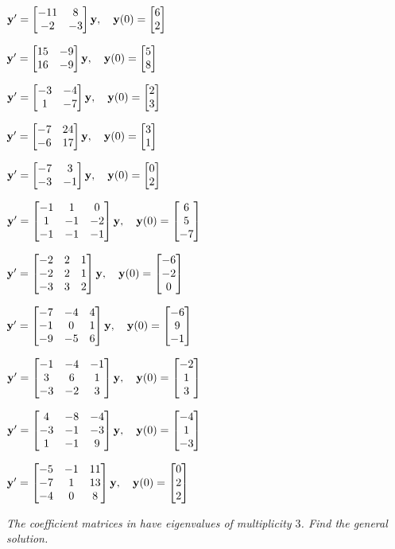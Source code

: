 \begin{exerciselist}
\item\label{exer:10.5.13}$\mathbf{y}'=\begin{bmatrix}-11&8\\-2&-3\end{bmatrix}\mathbf{y} ,\quad\mathbf{y}(0)=\begin{bmatrix}6\\2\end{bmatrix}$

\item\label{exer:10.5.14}$\mathbf{y}'=\begin{bmatrix}15&-9\\16&-9\end{bmatrix}\mathbf{y} ,\quad\mathbf{y}(0)=\begin{bmatrix}5\\8\end{bmatrix}$

\item\label{exer:10.5.15}$\mathbf{y}'=\begin{bmatrix}-3&-4\\1&-7\end{bmatrix}\mathbf{y},\quad\mathbf{y}(0)=\begin{bmatrix}2\\3\end{bmatrix}$

\item\label{exer:10.5.16}$\mathbf{y}'=\begin{bmatrix}-7&24\\-6&17\end{bmatrix}\mathbf{y} ,\quad\mathbf{y}(0)=\begin{bmatrix}3\\1\end{bmatrix}$

\item\label{exer:10.5.17}$\mathbf{y}'=\begin{bmatrix}-7&3\\-3&-1\end{bmatrix}\mathbf{y} ,\quad\mathbf{y}(0)=\begin{bmatrix}0\\2\end{bmatrix}$

\item\label{exer:10.5.18}$\mathbf{y}'
=\begin{bmatrix}-1&1&0\\1&-1&-2\\-1&-1&-1\end{bmatrix}\mathbf{y},\quad
\mathbf{y}(0)=\begin{bmatrix}6\\5\\-7\end{bmatrix}$

\item\label{exer:10.5.19}$\mathbf{y}'
=\begin{bmatrix}-2&2&1\\-2&2&1\\-3&3&2\end{bmatrix}\mathbf{y},\quad
\mathbf{y}(0)=\begin{bmatrix}-6\\-2\\0\end{bmatrix}$

\item\label{exer:10.5.20}$\mathbf{y}'
=\begin{bmatrix}-7&-4&4\\-1&0&1\\-9&-5&6\end{bmatrix}\mathbf{y},\quad
\mathbf{y}(0)=\begin{bmatrix}-6\\9\\-1\end{bmatrix}$

\item\label{exer:10.5.21}$\mathbf{y}'
=\begin{bmatrix}-1&-4&-1\\3&6&1\\-3&-2&3\end{bmatrix}\mathbf{y},\quad\mathbf{y}(0)=\begin{bmatrix}-2\\1\\3\end{bmatrix}$

\item\label{exer:10.5.22}$\mathbf{y}'
=\begin{bmatrix}4&-8&-4\\-3&-1&-3\\1&-1&9\end{bmatrix}\mathbf{y},\quad
\mathbf{y}(0)=\begin{bmatrix}-4\\1\\-3\end{bmatrix}$

\item\label{exer:10.5.23}$\mathbf{y}'=
\begin{bmatrix}-5&-1&11\\-7&1&13\\-4&0&8\end{bmatrix}\mathbf{y},\quad
\mathbf{y}(0)=\begin{bmatrix}0\\2\\2\end{bmatrix}$
\end{exerciselist}
%
\textsl{The coefficient matrices in
have eigenvalues of multiplicity $3$. Find the
general solution.}
